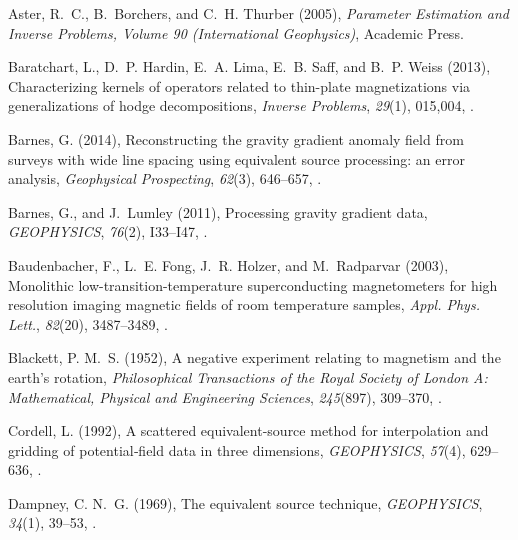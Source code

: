 \documentclass[draft,gc]{agutex}
\begin{document}
\begin{article}
\begin{thebibliography}{56}
Aster, R.~C., B.~Borchers, and C.~H. Thurber (2005), \textit{Parameter
  Estimation and Inverse Problems, Volume 90 (International Geophysics)},
  Academic Press.

Baratchart, L., D.~P. Hardin, E.~A. Lima, E.~B. Saff, and B.~P. Weiss (2013),
  Characterizing kernels of operators related to thin-plate magnetizations via
  generalizations of hodge decompositions, \textit{Inverse Problems},
  \textit{29}(1), 015,004, .

Barnes, G. (2014), Reconstructing the gravity gradient anomaly field from
  surveys with wide line spacing using equivalent source processing: an error
  analysis, \textit{Geophysical Prospecting}, \textit{62}(3), 646--657,
  .

Barnes, G., and J.~Lumley (2011), Processing gravity gradient data,
  \textit{GEOPHYSICS}, \textit{76}(2), I33--I47, .

Baudenbacher, F., L.~E. Fong, J.~R. Holzer, and M.~Radparvar (2003), Monolithic
  low-transition-temperature superconducting magnetometers for high resolution
  imaging magnetic fields of room temperature samples, \textit{Appl. Phys.
  Lett.}, \textit{82}(20), 3487--3489,
  .

Blackett, P. M.~S. (1952), A negative experiment relating to magnetism and the
  earth{\textquoteright}s rotation, \textit{Philosophical Transactions of the
  Royal Society of London A: Mathematical, Physical and Engineering Sciences},
  \textit{245}(897), 309--370, .

Cordell, L. (1992), A scattered equivalent-source method for interpolation and
  gridding of potential‐field data in three dimensions, \textit{GEOPHYSICS},
  \textit{57}(4), 629--636, .

Dampney, C. N.~G. (1969), The equivalent source technique, \textit{GEOPHYSICS},
  \textit{34}(1), 39--53, .


\end{thebibliography}
\end{article}
\end{document}
